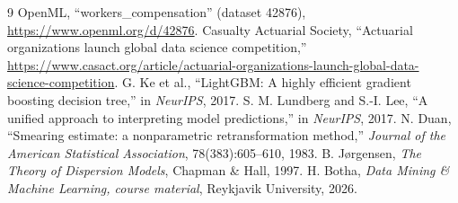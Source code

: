 \documentclass[10pt,twocolumn,letterpaper]{article}
\begin{document}
\begin{thebibliography}{9}
 OpenML, ``workers\_compensation'' (dataset 42876), \url{https://www.openml.org/d/42876}.
 Casualty Actuarial Society, ``Actuarial organizations launch global data science competition,''
\url{https://www.casact.org/article/actuarial-organizations-launch-global-data-science-competition}.
 G. Ke et al., ``LightGBM: A highly efficient gradient boosting decision tree,'' in \textit{NeurIPS}, 2017.
 S. M. Lundberg and S.-I. Lee, ``A unified approach to interpreting model predictions,'' in \textit{NeurIPS}, 2017.
 N. Duan, ``Smearing estimate: a nonparametric retransformation method,'' \textit{Journal of the American Statistical Association}, 78(383):605--610, 1983.
 B. J{\o}rgensen, \textit{The Theory of Dispersion Models}, Chapman \& Hall, 1997.
 H. Botha, \textit{Data Mining \& Machine Learning, course material}, Reykjavik University, 2026.
\end{thebibliography}
\end{document}
